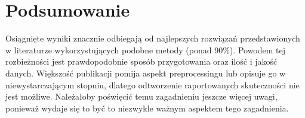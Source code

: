 \chapter{Podsumowanie}

Osiągnięte wyniki znacznie odbiegają od najlepszych rozwiązań przedstawionych w literaturze wykorzystujących podobne metody (ponad 90\%).
Powodem tej rozbieżności jest prawdopodobnie sposób przygotowania oraz ilość i jakość danych.
Większość publikacji pomija aspekt preprocessingu lub opisuje go w niewystarczającym stopniu, dlatego odtworzenie raportowanych skuteczności nie jest możliwe.
Należałoby poświęcić temu zagadnieniu jeszcze więcej uwagi, ponieważ wydaje się to być to niezwykle ważnym aspektem tego zagadnienia.

